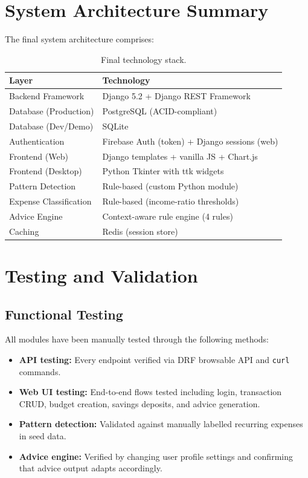 \documentclass[12pt,a4paper]{article}
\begin{document}
\section{System Architecture Summary}

The final system architecture comprises:

\begin{table}[h]
\centering
\begin{tabular}{ll}
\toprule
\textbf{Layer} & \textbf{Technology} \\
\midrule
Backend Framework     & Django 5.2 + Django REST Framework \\
Database (Production) & PostgreSQL (ACID-compliant) \\
Database (Dev/Demo)   & SQLite \\
Authentication        & Firebase Auth (token) + Django sessions (web) \\
Frontend (Web)        & Django templates + vanilla JS + Chart.js \\
Frontend (Desktop)    & Python Tkinter with ttk widgets \\
Pattern Detection     & Rule-based (custom Python module) \\
Expense Classification & Rule-based (income-ratio thresholds) \\
Advice Engine         & Context-aware rule engine (4 rules) \\
Caching               & Redis (session store) \\
\bottomrule
\end{tabular}
\caption{Final technology stack.}
\end{table}

\section{Testing and Validation}

\subsection{Functional Testing}
All modules have been manually tested through the following methods:
\begin{itemize}
  \item \textbf{API testing:} Every endpoint verified via DRF browsable API and \texttt{curl} commands.
  \item \textbf{Web UI testing:} End-to-end flows tested including login, transaction CRUD, budget creation, savings deposits, and advice generation.
  \item \textbf{Pattern detection:} Validated against manually labelled recurring expenses in seed data.
  \item \textbf{Advice engine:} Verified by changing user profile settings and confirming that advice output adapts accordingly.
\end{itemize}
\end{document}

